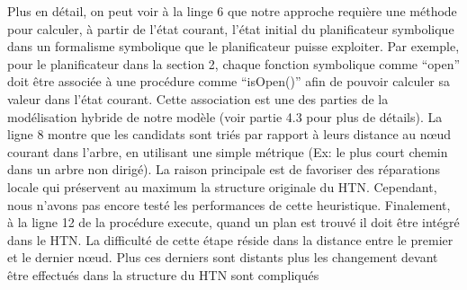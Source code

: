 \documentclass[a4paper,twoside,french]{article}
\begin{document}
			\par Plus en détail, on peut voir à la linge 6 que notre approche requière une méthode pour calculer,  à partir de l'état courant, l'état initial du planificateur symbolique dans un  formalisme symbolique que le planificateur puisse exploiter. Par exemple, pour le planificateur dans la section 2, chaque fonction symbolique comme ``open'' doit être associée à une procédure comme ``isOpen()'' afin de pouvoir calculer sa valeur dans l'état courant. Cette association est une des parties de la modélisation hybride de notre modèle (voir partie 4.3 pour plus de détails). La ligne 8 montre que les candidats sont triés par rapport à leurs distance au nœud courant dans l'arbre, en utilisant une simple métrique (Ex: le plus court chemin dans un arbre non dirigé). La raison principale est de favoriser des réparations locale qui  préservent au maximum  la structure originale du HTN. Cependant, nous n'avons pas encore testé les performances de cette heuristique. 
			Finalement, à la ligne 12 de la procédure {\sc execute}, quand un plan est trouvé il doit être intégré dans le HTN. La difficulté de cette étape réside dans la distance entre le premier et le dernier nœud. Plus ces derniers sont distants plus les changement  devant être effectués dans la structure du HTN sont compliqués 
\end{document}
